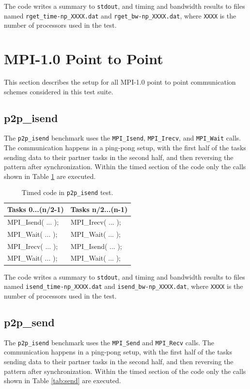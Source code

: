 \documentclass[10pt,a4paper]{report}
\begin{document}
The code writes a summary to \verb+stdout+, and timing and bandwidth results to files named \verb+rget_time-np_XXXX.dat+ and \verb+rget_bw-np_XXXX.dat+, where \verb+XXXX+ is the number of processors used in the test.

\section{MPI-1.0 Point to Point}
This section describes the setup for all MPI-1.0 point to point communication schemes considered in this test suite.

\subsection{p2p\_isend}
The \verb+p2p_isend+ benchmark uses the \verb+MPI_Isend+, \verb+MPI_Irecv+, and \verb+MPI_Wait+ calls. The communication happens in a ping-pong setup, with the first half of the tasks sending data to their partner tasks in the second half, and then reversing the pattern after synchronization. Within the timed section of the code only the calls shown in Table \ref{tab:isend} are executed.

\begin{table}[ht]
\centering
\caption{Timed code in \texttt{p2p\_isend} test.}
\label{tab:isend}
\begin{tabular}{|l|l|}
\hline
\bf{Tasks 0...(n/2-1)}	& \bf{Tasks n/2...(n-1)}\\\hline
MPI\_Isend( ... );      & MPI\_Irecv( ... );\\
MPI\_Wait( ... );       & MPI\_Wait( ... );\\
MPI\_Irecv( ... );      & MPI\_Isend( ... );\\
MPI\_Wait( ... );       & MPI\_Wait( ... );\\\hline
\end{tabular}
\end{table}

The code writes a summary to \verb+stdout+, and timing and bandwidth results to files named \verb+isend_time-np_XXXX.dat+ and \verb+isend_bw-np_XXXX.dat+, where \verb+XXXX+ is the number of processors used in the test.

\FloatBarrier
\subsection{p2p\_send}
The \verb+p2p_isend+ benchmark uses the \verb+MPI_Send+ and \verb+MPI_Recv+ calls. The communication happens in a ping-pong setup, with the first half of the tasks sending data to their partner tasks in the second half, and then reversing the pattern after synchronization. Within the timed section of the code only the calls shown in Table \ref{tab:send} are executed.
\end{document}
